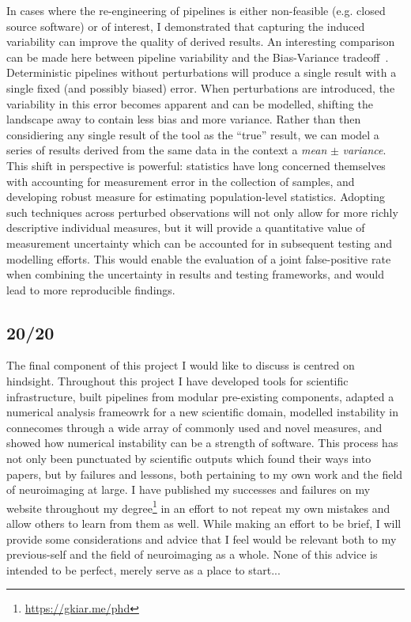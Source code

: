 In cases where the re-engineering of pipelines is either non-feasible (e.g. closed source software) or of
interest, I demonstrated that capturing the induced variability can improve the quality of derived results. An
interesting comparison can be made here between pipeline variability and the Bias-Variance
tradeoff~\cite{jain2000statistical}. Deterministic pipelines without perturbations will produce a single result
with a single fixed (and possibly biased) error. When perturbations are introduced, the variability in this
error becomes apparent and can be modelled, shifting the landscape away to contain less bias and more variance.
Rather than then considiering any single result of the tool as the ``true'' result, we can model a series of
results derived from the same data in the context a \textit{mean} $\pm$ \textit{variance}. This shift in
perspective is powerful: statistics have long concerned themselves with accounting for measurement error in the
collection of samples, and developing robust measure for estimating population-level statistics. Adopting such
techniques across perturbed observations will not only allow for more richly descriptive individual
measures, but it will provide a quantitative value of measurement uncertainty which can be accounted for
in subsequent testing and modelling efforts. This would enable the evaluation of a joint false-positive rate
when combining the uncertainty in results and testing frameworks, and would lead to more reproducible findings.

\subsection{20/20}
The final component of this project I would like to discuss is centred on hindsight. Throughout this project I
have developed tools for scientific infrastructure, built pipelines from modular pre-existing components,
adapted a numerical analysis frameowrk for a new scientific domain, modelled instability in connecomes through
a wide array of commonly used and novel measures, and showed how numerical instability can be a strength of
software. This process has not only been punctuated by scientific outputs which found their ways into papers,
but by failures and lessons, both pertaining to my own work and the field of neuroimaging at large. I have
published my successes and failures on my website throughout my degree\footnote{\url{https://gkiar.me/phd}} in
an effort to not repeat my own mistakes and allow others to learn from them as well. While making an effort to
be brief, I will provide some considerations and advice that I feel would be relevant both to my previous-self
and the field of neuroimaging as a whole. None of this advice is intended to be perfect, merely serve as a
place to start...

